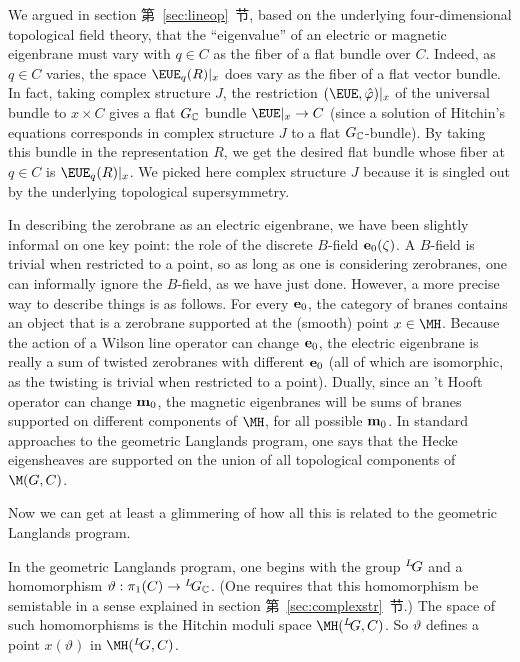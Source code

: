 We argued in section 第~\ref{sec:lineop}~节, based on the underlying
four-dimensional topological field theory, that the ``eigenvalue''
of an electric or magnetic eigenbrane must vary with $q\in C$ as
the fiber of a flat bundle over $C$.  Indeed, as $q\in C$ varies,
the space ${\EUE}_q(R)|_x$ does vary as the fiber of a flat vector
bundle. In fact, taking complex structure $J$, the restriction
$({\EUE},\hat\varphi)|_x$ of the universal bundle to $x\times C$
gives a flat $G_{\Bbb{C}}$ bundle ${\EUE}|_x\to C$ (since a
solution of Hitchin's equations corresponds in complex structure
$J$ to a flat $G_{\Bbb{C}}$-bundle). By taking this bundle in the
representation $R$, we get the desired flat bundle whose fiber at
$q\in C$ is ${\EUE}_q(R)|_x$.  We picked here complex structure
$J$ because it is singled out by the underlying topological
supersymmetry.

In describing the zerobrane as an electric eigenbrane, we have
been slightly informal on one key point: the role of the discrete
$B$-field ${\bf e}_0(\zeta)$.  A $B$-field is trivial when
restricted to a point, so as long as one is considering
zerobranes, one can informally ignore the $B$-field, as we have
just done.  However, a more precise way to describe things is as
follows.  For every ${\bf e}_0$, the category of branes contains
an object that is a zerobrane supported at the (smooth) point
$x\in \MH$.  Because the action of a Wilson line operator can
change ${\bf e}_0$, the electric eigenbrane is really a sum of
twisted zerobranes with different ${\bf e}_0$ (all of which are
isomorphic, as the twisting is trivial when restricted to a
point). Dually, since an 't Hooft operator can change ${\bf m}_0$,
the magnetic eigenbranes will be sums of branes supported on
different components of $\MH$, for all possible ${\bf m}_0$.  In
standard approaches to the geometric Langlands program, one says
that the Hecke eigensheaves are supported on the union of all
topological components of $\M(G,C)$.

\par{}

Now we can get at least a glimmering of how all this is related to
the geometric Langlands program.

In the geometric Langlands program, one begins with the  group
$^L\negthinspace G$ and a homomorphism $\vartheta:\pi_1(C)\to{}
^L\negthinspace G_{\Bbb{C}}$. (One requires that this homomorphism
be semistable in a sense explained in section 第~\ref{sec:complexstr}~节.) The
space of such homomorphisms is the Hitchin moduli space
$\MH(^L\negthinspace G,C)$.  So $\vartheta$ defines a point
$x(\vartheta)$ in $\MH(^L\negthinspace G,C)$.

